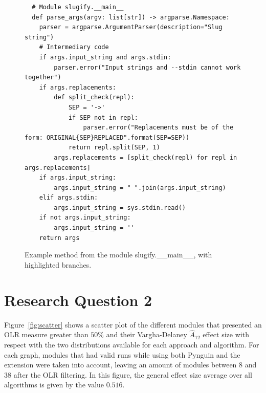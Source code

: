 \documentclass[%
  chapterprefix=false,%
  open=right,%
  twoside=true,%
  paper=a4,%
  logofile={Figures/logo.png},%
  thesistype=master,%
  UKenglish,%
]{se2thesis}
\begin{document}
\begin{figure}
\begin{verbatim}
  # Module slugify.__main__
  def parse_args(argv: list[str]) -> argparse.Namespace:
    parser = argparse.ArgumentParser(description="Slug string")
    # Intermediary code
    if args.input_string and args.stdin:
        parser.error("Input strings and --stdin cannot work together")
    if args.replacements:
        def split_check(repl):
            SEP = '->'
            if SEP not in repl:
                parser.error("Replacements must be of the form: ORIGINAL{SEP}REPLACED".format(SEP=SEP))
            return repl.split(SEP, 1)
        args.replacements = [split_check(repl) for repl in args.replacements]
    if args.input_string:
        args.input_string = " ".join(args.input_string)
    elif args.stdin:
        args.input_string = sys.stdin.read()
    if not args.input_string:
        args.input_string = ''
    return args
\end{verbatim}
\caption{Example method from the module slugify.\_\_main\_\_, with highlighted branches.}\label{lst:8}
\end{figure}


\newpage


\section{Research Question 2}

Figure~\ref{fig:scatter} shows a scatter plot of the different modules that presented an OLR measure greater than \(50\%\) and their Vargha-Delaney \(\hat{A}_{12}\) effect size with respect with the two distributions available for each approach and algorithm.
For each graph, modules that had valid runs while using both Pynguin and the extension were taken into account, leaving an amount of modules between \(8\) and \(38\) after the OLR filtering.
In this figure, the general effect size average over all algorithms is given by the value \(0.516\). 
\end{document}
